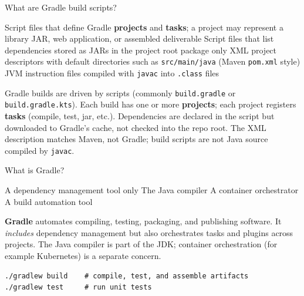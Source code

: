 \question[4]
What are Gradle build scripts?
\begin{choices}
  \CorrectChoice Script files that define Gradle \textbf{projects} and \textbf{tasks}; a project may represent a library JAR, web application, or assembled deliverable
  \choice Script files that list dependencies stored as JARs in the project root package only
  \choice XML project descriptors with default directories such as \texttt{src/main/java} (Maven \texttt{pom.xml} style)
  \choice JVM instruction files compiled with \lstinline[style=javainline]|javac| into \texttt{.class} files
\end{choices}
\begin{solution}
  Gradle builds are driven by scripts (commonly \lstinline[style=bashinline]|build.gradle| or \lstinline[style=bashinline]|build.gradle.kts|). Each build has one or more \textbf{projects}; each project registers \textbf{tasks} (compile, test, jar, etc.). Dependencies are declared in the script but downloaded to Gradle's cache, not checked into the repo root. The XML description matches Maven, not Gradle; build scripts are not Java source compiled by \lstinline[style=javainline]|javac|.
\end{solution}

\question[4]
What is Gradle?
\begin{choices}
  \choice A dependency management tool only
  \choice The Java compiler
  \choice A container orchestrator
  \CorrectChoice A build automation tool
\end{choices}
\begin{solution}
  \textbf{Gradle} automates compiling, testing, packaging, and publishing software. It \emph{includes} dependency management but also orchestrates tasks and plugins across projects. The Java compiler is part of the JDK; container orchestration (for example Kubernetes) is a separate concern.
\begin{lstlisting}[style=bash]
./gradlew build    # compile, test, and assemble artifacts
./gradlew test     # run unit tests
\end{lstlisting}
\end{solution}

